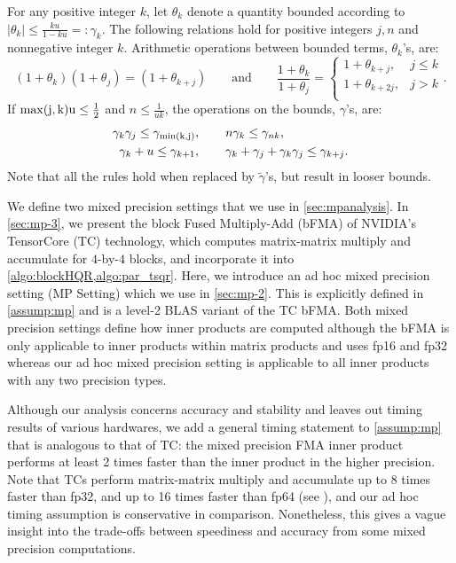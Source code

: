 \documentclass[review,onefignum,onetabnum]{siamart190516}
\newcommand{\tth}{\theta}
\begin{document}
\begin{lemma}
\label{lem:up}
For any positive integer $k$, let $\tth_{k}$ denote a quantity bounded according to $|\tth_{k}|\leq \frac{k u }{1-ku} =:\gamma_{k}$. The following relations hold for positive integers $j,n$ and nonnegative integer $k$.
Arithmetic operations between bounded terms, $\tth_{k}$'s, are: 
\begin{equation}
(1+\tth_{k})(1+\tth_{j})=(1+\tth_{k+j})\qquad \mbox{and} \qquad\frac{1+\tth_{k}}{1+\tth_{j}} =
\begin{cases}
	1+\tth_{k+j},& j \leq k\\
	1+\tth_{k+2j},& j > k\\
\end{cases} .
\end{equation}
If $\rm{max}(j,k) u \leq \frac{1}{2}$ and $n \leq \frac{1}{uk}$, the operations on the bounds, $\gamma$'s, are:
	\begin{align*}
	\gamma_{k}\gamma_{j} \leq \gamma_{\rm{min}(k,j)}&,\qquad n\gamma_{k} \leq \gamma_{nk},\\
	\gamma_{k} + u \leq \gamma_{k+1}&,\qquad \gamma_{k}+\gamma_{j}+\gamma_{k}\gamma_{j} \leq \gamma_{k+j}.
	\end{align*}
Note that all the rules hold when replaced by $\tilde{\gamma}$'s, but result in looser bounds.
\end{lemma}

We define two mixed precision settings that we use in \cref{sec:mpanalysis}.
In \cref{sec:mp-3}, we present the block Fused Multiply-Add (bFMA) of NVIDIA's TensorCore (TC) technology, which computes matrix-matrix multiply and accumulate for $4$-by-$4$ blocks, and incorporate it into \cref{algo:blockHQR,algo:par_tsqr}.
Here, we introduce an ad hoc mixed precision setting (MP Setting) which we use in \cref{sec:mp-2}.
This is explicitly defined in \cref{assump:mp} and is a level-2 BLAS variant of the TC bFMA. 
Both mixed precision settings define how inner products are computed although the bFMA is only applicable to inner products within matrix products and uses fp16 and fp32 whereas our ad hoc mixed precision setting is applicable to all inner products with any two precision types.\par

Although our analysis concerns accuracy and stability and leaves out timing results of various hardwares, we add a general timing statement to \cref{assump:mp} that is analogous to that of TC: the mixed precision FMA inner product performs at least 2 times faster than the inner product in the higher precision.
Note that TCs perform matrix-matrix multiply and accumulate up to 8 times faster than fp32, and up to 16 times faster than fp64 (see \cite{Markidis2018}), and our ad hoc timing assumption is conservative in comparison. 
Nonetheless, this gives a vague insight into the trade-offs between speediness and accuracy from some mixed precision computations.
\end{document}
